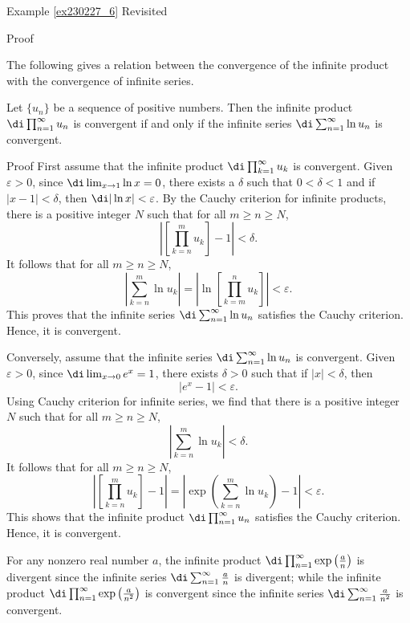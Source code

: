 \begin{example}{\linkt Example \ref{ex230227_6} Revisited}
\begin{example}[label=ex230227_13]{}
\begin{myproof}{Proof}
\end{myproof}

The following  gives a relation between the convergence of the infinite product with the convergence of infinite series. 
\begin{theorem}[label=thm220929_1]{}
Let $\{u_n\}$ be a sequence of positive numbers.  Then the infinite product $\di\prod_{n=1}^{\infty}u_n$ is convergent if and only if the infinite series $\di\sum_{n=1}^{\infty}\ln u_n$ is convergent. 
\end{theorem}
\begin{myproof}{Proof}
First assume that the infinite product $\di\prod_{k=1}^{\infty}u_k$ is convergent.  
Given $\varepsilon>0$, since
$\di \lim_{x\rightarrow 1}\ln x=0$, there exists a $\delta$ such that
$0<\delta<1$ and if $|x-1|<\delta$, then
$\di |\ln x|<\varepsilon$.
By the Cauchy criterion for infinite products,   there is a
 positive integer $N $ such that for all $m\geq n\geq N$, 
\[\left|\left[\prod_{k=n}^m u_k\right]-1\right|<\delta.\] 
It follows that
  for all $m\geq n\geq N$, 
 \[\left| \sum_{k=n}^m \ln u_k \right|=\left|\ln\left[\prod_{k=m}^n u_k\right]\right|<\varepsilon.\]
This proves that the  infinite series $\di\sum_{n=1}^{\infty}\ln u_n$ satisfies the Cauchy criterion. Hence, it is convergent.

Conversely, assume that the infinite series $\di\sum_{n=1}^{\infty}\ln u_n$ is convergent. 
  Given $\varepsilon>0$, since
$\di \lim_{x\rightarrow 0}e^x=1$, there exists $\delta>0$ such that if $|x|<\delta$, then 
\[|e^x-1|<\varepsilon.\]\bp
 Using Cauchy criterion for infinite series, we find that there is a positive integer $N$ such that for all $m\geq n\geq N$,
\[\left|\sum_{k=n}^m\ln u_k\right|<\delta.\] 
It follows that for all $m\geq n\geq N$,
\[\left|\left[\prod_{k=n}^m u_k\right]-1\right|=\left|\exp\left(\sum_{k=n}^m\ln u_k\right)-1\right|<\varepsilon.\]
 This shows that the infinite product $\di\prod_{n=1}^{\infty}u_n$ satisfies the Cauchy criterion. Hence, it is convergent.
\end{myproof}

\begin{example}{}
For any nonzero real number $a$, the infinite product $\di \prod_{n=1}^{\infty} \exp\left(\frac{a}{n}\right)$ is divergent since the infinite series $\di\sum_{n=1}^{\infty}\frac{a}{n}$ is divergent; while the infinite product $\di \prod_{n=1}^{\infty} \exp\left(\frac{a}{n^2}\right)$ is convergent since the infinite series $\di\sum_{n=1}^{\infty}\frac{a}{n^2}$ is convergent. 
\end{example}


\end{example}
\end{example}
